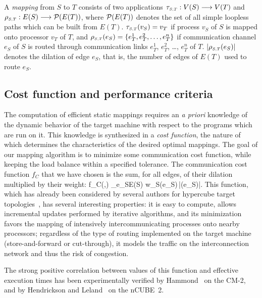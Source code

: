 A \emph{mapping} from $S$ to $T$ consists of two applications
${\tau_{\scriptscriptstyle {S,T}}} : V(S) \longrightarrow V(T)$ and
${\rho_{\scriptscriptstyle {S,T}}} : E(S) \longrightarrow {\cal P}(E(T))$,
where ${\cal P}(E(T))$ denotes the set of all simple loopless paths which
can be built from $E(T)$.
${\tau_{\scriptscriptstyle {S,T}}}(v_S) = v_T$ if process $v_S$ of $S$ is mapped onto processor
$v_T$ of $T$, and ${\rho_{\scriptscriptstyle {S,T}}}(e_S) = \{ e^1_T, e^2_T, \ldots, e^n_T \}$ if
communication channel $e_S$ of $S$ is routed through communication links
$e^1_T$, $e^2_T$, \ldots, $e^n_T$ of $T$.
$|{\rho_{\scriptscriptstyle {S,T}}}(e_S)|$ denotes the dilation of edge $e_S$, that is, the number of
edges of $E(T)$ used to route $e_S$.

\subsection{Cost function and performance criteria}

The computation of efficient static mappings requires an \emph{a priori\/}
knowledge of the dynamic behavior of the target machine with respect to
the programs which are run on it.
This knowledge is synthesized in a \emph{cost function}, the nature of which
determines the characteristics of the desired optimal mappings.
The goal of our mapping algorithm is to minimize some communication cost
function, while keeping the load balance within a specified tolerance.
The communication cost function $f_C$ that we have chosen is the sum,
for all edges, of their dilation multiplied by their weight:
\bn
f_C(,)
\eqdef \hspace*{-0.25cm}\sum\limits_{e_S\in E(S)}\hspace*{-0.25cm}
w_S(e_S)\,|(e_S)|\enspace.
\en
This function, which has already been considered by several authors for
hypercube target topologies~\cite{errasa90,hamm92,hele94b}, has several
interesting properties:
it is easy to compute, allows incremental updates performed by
iterative algorithms, and
its minimization favors the mapping of intensively intercommunicating
processes onto nearby processors;
regardless of the type of routing implemented on the target machine
(store-and-forward or cut-through), it models the traffic on the
interconnection network and thus the risk of congestion.

The strong positive correlation between values of this function and
effective execution times has been experimentally verified by
Hammond~\cite{hamm92} on the CM-2, and by Hendrickson and
Leland~\cite{hele94a} on the nCUBE~2.
\hfill~\\

